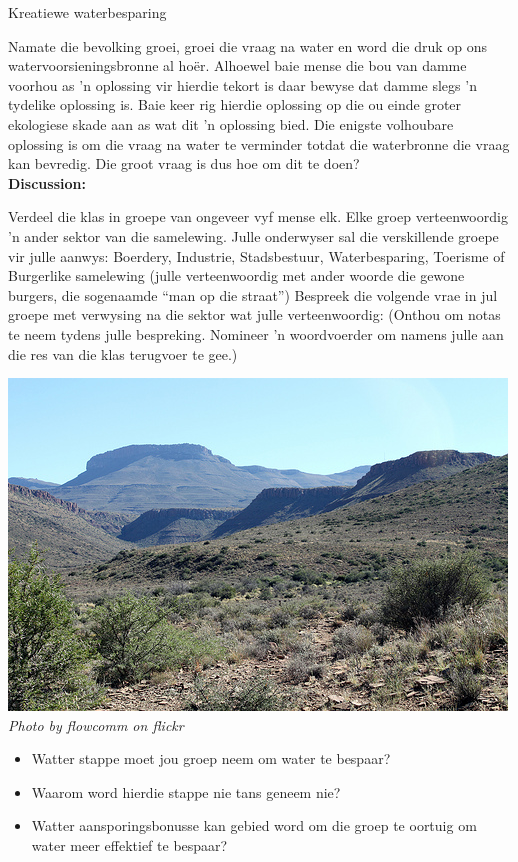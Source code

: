             \begin{groupdiscussion}{ Kreatiewe waterbesparing
}
            \nopagebreak

\label{m38138*uid289435}Namate die bevolking groei, groei die vraag na water en word die druk op ons watervoorsieningsbronne al hoër. Alhoewel baie mense die bou van damme voorhou as  'n oplossing vir hierdie tekort is daar bewyse dat damme slegs  'n tydelike oplossing is. Baie keer rig hierdie oplossing op die ou einde groter ekologiese skade aan as wat dit  'n oplossing bied. Die enigste volhoubare oplossing is om die vraag na water te verminder totdat die waterbronne die vraag kan bevredig. Die groot vraag is dus hoe om dit te doen?\\
\label{m38138*uid5630}\textbf{Discussion:}
\begin{minipage}{.6\textwidth}
 Verdeel die klas in groepe van ongeveer vyf mense elk. Elke groep verteenwoordig  'n ander sektor van die samelewing. Julle onderwyser sal die verskillende groepe vir julle aanwys: Boerdery, Industrie, Stadsbestuur, Waterbesparing, Toerisme of Burgerlike samelewing (julle verteenwoordig met ander woorde die gewone burgers, die sogenaamde “man op die straat”) Bespreek die volgende vrae in jul groepe met verwysing na die sektor wat julle verteenwoordig: (Onthou om notas te neem tydens julle bespreking. Nomineer  'n woordvoerder om namens julle aan die res van die klas terugvoer te gee.)
\end{minipage}
\begin{minipage}{.4\textwidth}
 \begin{center}
  \includegraphics[width=.6\textwidth]{photos/karoo_flowcomm.jpg} \\
\textsl{Photo by flowcomm on flickr}
 \end{center}

\end{minipage}
\label{m38138*id342317}\begin{itemize}[noitemsep]
            \label{m38138*uid88}\item Watter stappe moet jou groep neem om water te bespaar?
\label{m38138*uid89}\item Waarom word hierdie stappe nie tans geneem nie?
\label{m38138*uid90}\item Watter aansporingsbonusse kan gebied word om die groep te oortuig om water meer effektief te bespaar?
\end{itemize}


\end{groupdiscussion}
